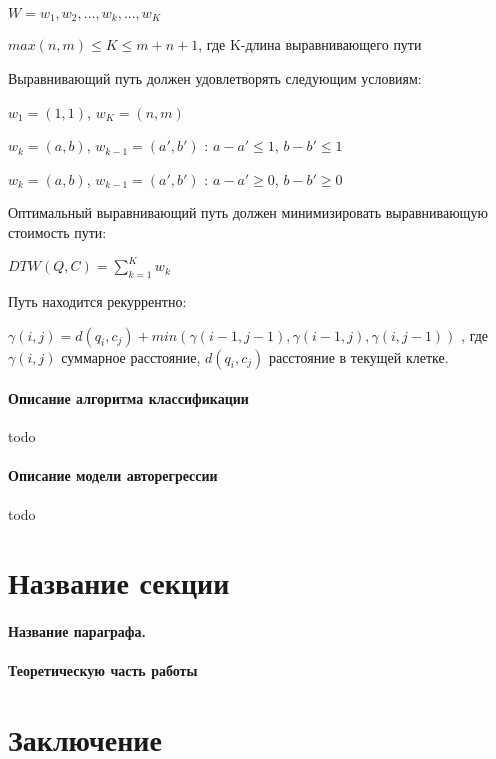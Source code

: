 \documentclass[12pt,twoside]{article}
\begin{document}
				$W = w_1,w_2, ..., w_k, ..., w_K $

				$max(n, m)\leq K \leq m+n+1$, где K-длина выравнивающего пути
				
				Выравнивающий путь должен удовлетворять следующим условиям:
				
				$w_1=(1,1)$, $w_K=(n, m)$
				
				$w_k = (a, b)$, $w_{k-1}=(a', b')$ : $a-a' \leq 1$, $b-b' \leq 1$ 
				
				$w_k = (a, b)$, $w_{k-1}=(a', b')$ : $a-a' \geq 0$, $b-b'\geq 0$
				
				Оптимальный выравнивающий путь должен минимизировать выравнивающую стоимость пути:
				
				$DTW(Q, C)=\displaystyle\sum_{k=1}^{K} w_k$
				
				Путь находится рекуррентно:
				
				$\gamma(i, j) = d(q_i, c_j) + min({\gamma(i-1, j-1), \gamma(i-1, j), \gamma(i, j-1)})$ , где $\gamma(i, j)$ суммарное расстояние, $d(q_i, c_j)$ расстояние в текущей клетке.
				
				\paragraph{Описание алгоритма классификации}
				
				todo
				
				\paragraph{Описание модели авторегрессии}
				
				todo
				
				
		
		\section{Название секции}
    \paragraph{Название параграфа.}
    \paragraph{Теоретическую часть работы}
    \section{Заключение}

		 
    
    
    
\end{document}
